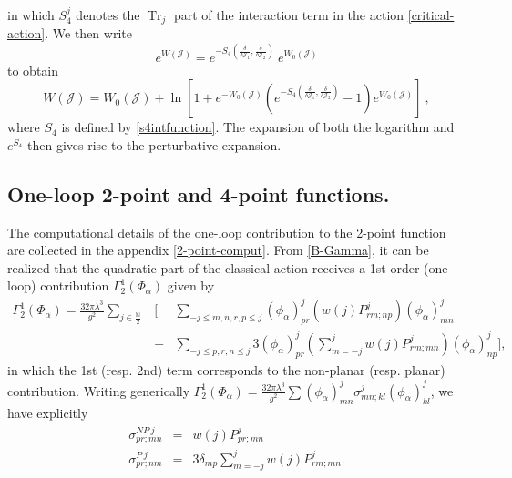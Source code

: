 \documentclass[a4paper,11pt,twoside]{article}
\numberwithin{equation}{section}
\DeclareMathOperator{\tr}{Tr}
\theoremstyle{nonumberplain}
\newcounter{and}
\begin{document}
in which $S^j_4$ denotes the $\tr_j$ part of the interaction term in the action \eqref{critical-action}. We then write 
\begin{equation*}
e^{W(\mathcal{J})} = e^{-S_4(\frac{\delta}{\delta\mathcal{J}_1},\frac{\delta}{\delta\mathcal{J}_2})}\ e^{W_0(\mathcal{J})}
\end{equation*}
%
to obtain%
%
\begin{equation}
W(\mathcal{J}) = W_0(\mathcal{J}) + \ln\left[ 1 + e^{-W_0(\mathcal{J})}
\left( e^{-S_4(\frac{\delta}{\delta\mathcal{J}_1},\frac{\delta}{\delta\mathcal{J}_2})} - 1 \right) e^{W_0(\mathcal{J})}\right] \ , \label{connected-funct}
\end{equation}
%
where $S_4$ is defined by \eqref{s4intfunction}. The expansion of both the logarithm and $e^{S_4}$ then gives rise to the perturbative expansion. \par 

\subsection{One-loop 2-point and 4-point functions.}\label{subsection322}


The computational details of the one-loop contribution to the 2-point function are collected in the appendix \ref{2-point-comput}. From \eqref{B-Gamma}, it can be realized that the quadratic part of the classical action receives a 1st order (one-loop) contribution $\Gamma^1_2(\Phi_\alpha)$ given by
\begin{eqnarray}
\Gamma^1_2(\Phi_\alpha)=\frac{32\pi\lambda^3}{g^2}\sum_{j\in\frac{\mathbb{N}}{2}}&\Bigg[&\sum_{-j\le m,n,r,p\le j}(\phi_\alpha)^j_{pr}\left(w(j)P^j_{rm;np}\right)(\phi_\alpha)^j_{mn}\nonumber\\
&+&\sum_{-j\le p,r,n\le j}3(\phi_\alpha)^j_{pr}\left(\sum_{m=-j}^jw(j)P^j_{rm;mn}\right)(\phi_\alpha)^j_{np} \Bigg]\label{Gamma-oneloop},
\end{eqnarray}
in which the 1st (resp. 2nd) term corresponds to the non-planar (resp. planar) contribution. Writing generically $\Gamma^1_2(\Phi_\alpha)=\frac{32\pi\lambda^3}{g^2}\sum(\phi_\alpha)^j_{mn}\sigma^j_{mn;kl}(\phi_\alpha)^j_{kl}$, we have explicitly
\begin{eqnarray}
\sigma^{NP\ j}_{pr;mn}&=& w(j)P^j_{pr;mn}\label{eff-act-np} \\
\sigma^{P\ j}_{pr;nm}&=&3\delta_{mp}\sum_{m=-j}^jw(j)P^j_{rm;mn}\label{eff-act-plan}.
\end{eqnarray}
\end{document}
